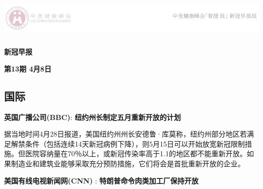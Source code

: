 \documentclass[
]{article}
\author{}
\date{\vspace{-2.5em}}
\begin{document}
\fontsize{14}{14}
\selectfont
\vspace{-10truemm}

\newcommand{\resheading}[1]{%
  \noindent\fcolorbox{lavenderblush}{lavenderblush}{\makebox[\dimexpr\textwidth-2\fboxsep-2\fboxrule][l]{\textbf{~#1}}}%
}

\begin{center}
\includegraphics[height=2cm]{./input/logo2.png} 
\end{center}

\vspace{-5truemm}

\begin{center}
\fontsize{40}{40}
\textcolor{glaucous}{\textbf{新冠早报}}
\end{center}

\begin{center}
\fontsize{20}{20}
{\textcolor{glaucous}{\textbf{第13期 \space 4月8日}}}
\end{center}

%
  \noindent{}%

\vspace{-5mm}

\hypertarget{section}{%
\subsection{\texorpdfstring{\textcolor{glaucous}{\Large 国际}}{}}\label{section}}

\vspace{-3mm}

\textbf{\textcolor{glaucous}{英国广播公司(BBC)}}:
\textbf{纽约州长制定五月重新开放的计划 }

据当地时间4月28日报道，美国纽约州州长安德鲁·库莫称，纽约州部分地区若满足解禁条件（包括连续14天新冠病例下降），则5月15日可以开始放宽新冠限制措施。但医院容纳量在70％以上，或新冠传染率高于1.1的地区都不能重新开放。如果制造业和建筑业能够采取充分预防措施，它们将会是首批重新开放的企业。

\textbf{\textcolor{glaucous}{美国有线电视新闻网(CNN)}} :
\textbf{特朗普命令肉类加工厂保持开放}
\end{document}
